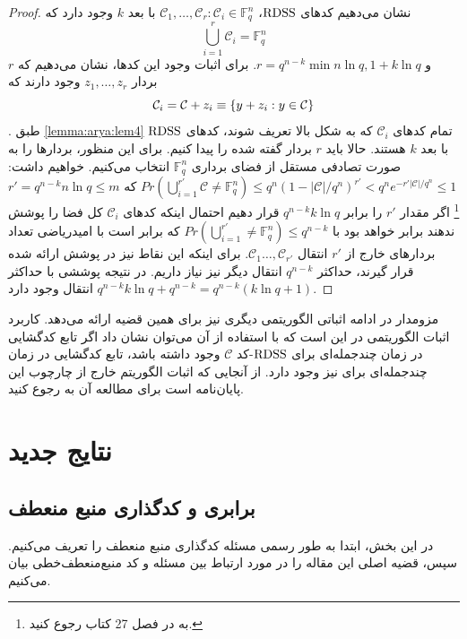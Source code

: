  \begin{proof}
 	نشان می‌دهیم کدهای
 	$\mathrm{RDSS}$،
 	$\mathcal{C}_1, \dots, \mathcal{C}_r: \mathcal{C}_i \in \mathbb{F}_q^n$
 	با بعد
 	$k$
 	وجود دارد که
 	\begin{equation}
 		\bigcup_{i = 1}^r \mathcal{C}_i = \mathbb{F}_q^n
 	\end{equation}
 	و 
 	$r = q^{n - k} \min{n \ln q, 1 + k \ln q}$.
 	برای اثبات وجود این کدها، نشان می‌دهیم که
 	$r$
 	بردار
 	$z_1, \dots, z_r$
 	وجود دارند که
 	\begin{equation}
 		\mathcal{C}_i = \mathcal{C} + z_i \equiv \left\{ y + z_i: y \in \mathcal{C} \right\}
 	\end{equation}.
 	طبق
 	\autoref{lemma:arya:lem4}
 	تمام کدهای
 	$\mathcal{C}_i$
 	که به شکل بالا تعریف شوند، کدهای
 	$\mathrm{RDSS}$
 	با بعد
 	$k$
 	هستند.	 حالا باید $r$ بردار گفته شده را پیدا کنیم. برای این منظور، بردارها را به صورت تصادفی مستقل از فضای برداری
 	$\mathbb{F}_q^n$
 	انتخاب می‌کنیم. خواهیم داشت:
 	$Pr(\bigcup_{i = 1}^{r'} \mathcal{C} \ne \mathbb{F}_q^n) \leq q^n (1 - |\mathcal{C}|/q^n)^{r'} < q^n e^{- r' |\mathcal{C}| / q^n} \leq 1$
 	که
 	$r' = q^{n - k} n \ln q \leq m$\footnote{
 	به
 	در فصل 27 کتاب
 	\cite{graham1995handbook}
 	رجوع کنید.
 	}
 	اگر مقدار
 	$r'$
 	را برابر
 	$q^{n - k} k \ln q$
 	قرار دهیم احتمال اینکه کدهای
 	$\mathcal{C}_i$
 	کل فضا را پوشش ندهند برابر خواهد بود با
 	$Pr(\bigcup_{i = 1}^{r'} \ne \mathbb{F}_q^n) \leq q^{n - k}$
 	که برابر است با امیدریاضی تعداد بردارهای خارج از 
 	$r'$
 	انتقال
 	$\mathcal{C}_1\ldots, \mathcal{C}_{r'}$.
 	برای اینکه این نقاط نیز در پوشش ارائه شده قرار گیرند، حداکثر 
 	$q^{n - k}$
 	 انتقال دیگر نیز نیاز داریم. در نتیجه پوششی با حداکثر
 	 $q^{n - k} k \ln q + q^{n - k} = q^{n - k}(k \ln q + 1)$
 	 انتقال وجود دارد.
 \end{proof}
 مزومدار در ادامه اثباتی الگوریتمی دیگری نیز برای همین قضیه ارائه می‌دهد. کاربرد اثبات الگوریتمی در این است که با استفاده از آن می‌توان نشان داد اگر تابع کدگشایی در زمان چندجمله‌ای برای 
 $\mathrm{RDSS}$-کد
 $\mathcal{C}$
 وجود داشته باشد، تابع کدگشایی در زمان چندجمله‌ای برای
 \icod
 نیز وجود دارد. از آنجایی که اثبات الگوریتم خارج از چارچوب این پایان‌نامه است برای مطالعه آن به
 \cite{arya}
 رجوع کنید.
 \newpage
\section{نتایج جدید}
\label{sec3}
\subsection{
	برابری 
	\picod
	 و کدگذاری منبع منعطف
}
در این بخش، ابتدا به طور رسمی مسئله کدگذاری منبع منعطف را تعریف می‌کنیم. سپس، قضیه اصلی این مقاله را در مورد ارتباط بین مسئله 
\picod
 و کد منبع‌منعطف‌خطی بیان می‌کنیم.
